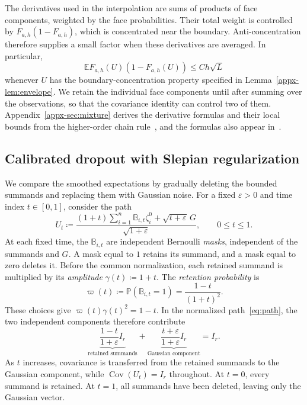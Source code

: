 \documentclass[11pt,letterpaper]{article}
\theoremstyle{remark}
\newcommand{\E}{\mathbb E}
\newcommand{\Pp}{\mathbb P}
\newcommand{\Cov}{\operatorname{Cov}}
\begin{document}
The derivatives used in the interpolation are sums of products of
face components, weighted by the face probabilities. Their total
weight is controlled by \(F_{a,h}(1-F_{a,h})\), which is concentrated
near the boundary. Anti-concentration therefore supplies a small
factor when these derivatives are averaged. In particular,
\[
 \E F_{a,h}(U)(1-F_{a,h}(U))\le Ch\sqrt L
\]
whenever \(U\) has the boundary-concentration property specified in
Lemma~\ref{appx-lem:envelope}. We retain the individual face components
until after summing over the observations, so that the covariance
identity can control two of them. Appendix~\ref{appx-sec:mixture}
derives the derivative formulas and their local bounds from the
higher-order chain rule~\cite{Comtet1974}, and the formulas also
appear in~\cite[Lemma~13]{GaoZhang}.

\subsection{Calibrated dropout with Slepian regularization}
\label{sec:outline-path}

We compare the smoothed expectations by gradually deleting the bounded
summands and replacing them with Gaussian noise. For a fixed
\(\varepsilon>0\) and time index \(t\in[0,1]\), consider the path
\begin{equation}
 U_t\coloneqq
 \frac{(1+t)\sum_{i=1}^n\mathbb B_{i,t}\zeta_i^0
             +\sqrt{t+\varepsilon}\,G}{\sqrt{1+\varepsilon}},
 \qquad 0\le t\le1.
 \label{eq:path}
\end{equation}
At each fixed time, the \(\mathbb B_{i,t}\) are independent Bernoulli
\emph{masks}, independent of the summands and \(G\). A mask equal to \(1\) retains
its summand, and a mask equal to zero deletes it. Before the common
normalization, each retained summand is multiplied by its \emph{amplitude}
\(\gamma(t)\coloneqq1+t\). The \emph{retention probability} is
\[
 \varpi(t)\coloneqq\Pp(\mathbb B_{i,t}=1)
             =\frac{1-t}{(1+t)^2}.
\]
These choices give \(\varpi(t)\gamma(t)^2=1-t\). In the normalized
path~\eqref{eq:path}, the two independent components therefore contribute
\[
 \underbrace{\frac{1-t}{1+\varepsilon}I_r}_{\text{retained summands}}
 +\underbrace{\frac{t+\varepsilon}{1+\varepsilon}I_r}_{\text{Gaussian component}}
 =I_r.
\]
As \(t\) increases, covariance is transferred from the retained summands
to the Gaussian component, while \(\Cov(U_t)=I_r\) throughout.
At \(t=0\), every summand is retained. At \(t=1\), all summands have
been deleted, leaving only the Gaussian vector.
\end{document}
